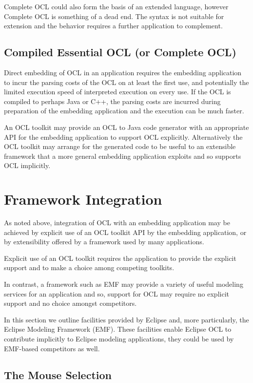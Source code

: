 \documentclass[a4paper]{article}
\begin{document}
Complete OCL could also form the basis of an extended language, however Complete OCL is something of a dead end. The syntax is not suitable for extension and the behavior requires a further application to complement.

\subsection{Compiled Essential OCL (or Complete OCL)}\label{CompiledEssentialOCL}

Direct embedding of OCL in an application requires the embedding application to incur the parsing costs of the OCL on at least the first use, and potentially the limited execution speed of interpreted execution on every use. If the OCL is compiled to perhaps Java or C++, the parsing costs are incurred during preparation of the embedding application and the execution can be much faster.

An OCL toolkit may provide an OCL to Java code generator with an appropriate API for the embedding application to support OCL explicitly. Alternatively the OCL toolkit may arrange for the generated code to be useful to an extensible framework that a more general embedding application exploits and so supports OCL implicitly.

\section{Framework Integration}\label{Framework-Integration}

As noted above, integration of OCL with an embedding application may be achieved by explicit use of an OCL toolkit API by the embedding application, or by extensibility offered by a framework used by many applications.

Explicit use of an OCL toolkit requires the application to provide the explicit support and to make a choice among competing toolkits.

In contrast, a framework such as EMF may provide a variety of useful modeling services for an application and so, support for OCL may require no explicit support and no choice amongst competitors.

In this section we outline facilities provided by Eclipse and, more particularly, the Eclipse Modeling Framework (EMF). These facilities enable Eclipse OCL to contribute implicitly to Eclipse modeling applications, they could be used by EMF-based competitors as well.

\subsection{The Mouse Selection}
\end{document}

